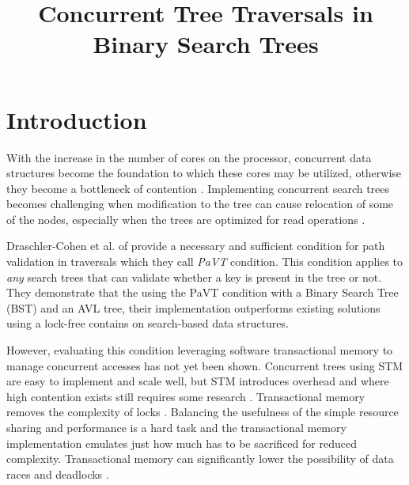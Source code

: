\documentclass[conference]{IEEEtran}
\theoremstyle{definition}
\theoremstyle{theorem}
\begin{document}
\title{Concurrent Tree Traversals in Binary Search Trees\\
}

\author{
\and
{}
}

\maketitle

\begin{abstract}

\end{abstract}

\section{Introduction}
With the increase in the number of cores on the processor, concurrent data structures become the foundation to which these cores may be utilized, otherwise they become a bottleneck of contention \cite{crain-cont}. Implementing concurrent search trees becomes challenging when modification to the tree can cause relocation of some of the nodes, especially when the trees are optimized for read operations \cite{pavt}.

Draschler-Cohen et al. of \cite{pavt} provide a necessary and sufficient condition for path validation in traversals which they call \textit{PaVT} condition. This condition applies to \textit{any} search trees that can validate whether a key is present in the tree or not. They demonstrate that the using the PaVT condition with a Binary Search Tree (BST) and an AVL tree, their implementation outperforms existing solutions using a lock-free contains on search-based data structures.

However, evaluating this condition leveraging software transactional memory to manage concurrent accesses has not yet been shown. Concurrent trees using STM are easy to implement and scale well, but STM introduces overhead and where high contention exists still requires some research \cite{bron}. Transactional memory removes the complexity of locks \cite{b4}. Balancing the usefulness of the simple resource sharing and performance is a hard task and the transactional memory implementation emulates just how much has to be sacrificed for reduced complexity. Transactional memory can significantly lower the possibility of data races and deadlocks \cite{b4}.
\end{document}
